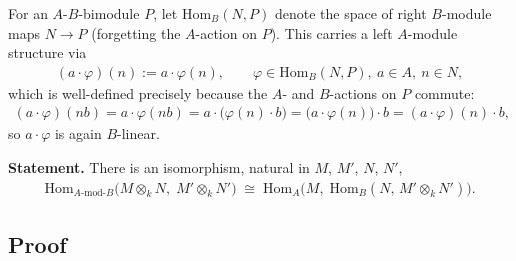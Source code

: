 \documentclass[11pt]{article}
\theoremstyle{definition}
\begin{document}
For an $A$-$B$-bimodule $P$, let $\mathrm{Hom}_B(N,P)$ denote the space of right
$B$-module maps $N \to P$ (forgetting the $A$-action on $P$). This carries a left
$A$-module structure via
\begin{align}
(a\cdot\varphi)(n) := a\cdot\varphi(n), \qquad \varphi \in \mathrm{Hom}_B(N,P),\ a\in A,\ n\in N,
\end{align}
which is well-defined precisely because the $A$- and $B$-actions on $P$ commute:
\begin{align}
(a\cdot\varphi)(nb) = a\cdot\varphi(nb) = a\cdot\big(\varphi(n)\cdot b\big)
= \big(a\cdot\varphi(n)\big)\cdot b = (a\cdot\varphi)(n)\cdot b,
\end{align}
so $a\cdot\varphi$ is again $B$-linear.

\bigskip
\textbf{Statement.} There is an isomorphism, natural in $M$, $M'$, $N$, $N'$,
\begin{align}
\boxed{
\mathrm{Hom}_{A\text{-}\mathrm{mod}\text{-}B}\big(M\otimes_k N,\; M'\otimes_k N'\big)
\;\cong\;
\mathrm{Hom}_A\big(M,\; \mathrm{Hom}_B(N,\, M'\otimes_k N')\big).}
\end{align}

\subsection*{Proof}
\end{document}
